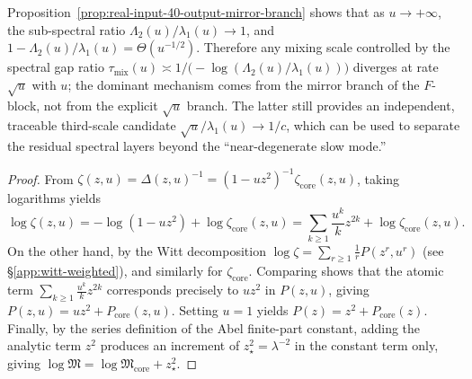 \begin{remark}\label{rem:real-input-40-output-mirror-mixing}
Proposition~\ref{prop:real-input-40-output-mirror-branch} shows that as \(u\to+\infty\), the sub-spectral ratio \(\Lambda_2(u)/\lambda_1(u)\to 1\), and
\(
1-\Lambda_2(u)/\lambda_1(u)=\Theta(u^{-1/2})
\).
Therefore any mixing scale controlled by the spectral gap ratio
\(
\tau_{\mathrm{mix}}(u)\asymp 1/\bigl(-\log(\Lambda_2(u)/\lambda_1(u))\bigr)
\)
diverges at rate \(\sqrt u\) with \(u\); the dominant mechanism comes from the mirror branch of the \(F\)-block, not from the explicit \(\sqrt u\) branch.
The latter still provides an independent, traceable third-scale candidate \(\sqrt u/\lambda_1(u)\to 1/c\), which can be used to separate the residual spectral layers beyond the ``near-degenerate slow mode.''
\end{remark}

\begin{proof}
From
\(
\zeta(z,u)=\Delta(z,u)^{-1}=(1-uz^2)^{-1}\zeta_{\mathrm{core}}(z,u)
\),
taking logarithms yields
\[
\log\zeta(z,u)=-\log(1-uz^2)+\log\zeta_{\mathrm{core}}(z,u)
=\sum_{k\ge 1}\frac{u^k}{k}z^{2k}+\log\zeta_{\mathrm{core}}(z,u).
\]
On the other hand, by the Witt decomposition \(\log\zeta=\sum_{r\ge 1}\frac{1}{r}P(z^{r},u^{r})\) (see \S\ref{app:witt-weighted}), and similarly for \(\zeta_{\mathrm{core}}\). Comparing shows that the atomic term \(\sum_{k\ge 1}\frac{u^k}{k}z^{2k}\) corresponds precisely to \(u z^2\) in \(P(z,u)\), giving
\(
P(z,u)=u z^2+P_{\mathrm{core}}(z,u)
\).
Setting \(u=1\) yields \(P(z)=z^2+P_{\mathrm{core}}(z)\).
Finally, by the series definition of the Abel finite-part constant, adding the analytic term \(z^2\) produces an increment of \(z_\star^2=\lambda^{-2}\) in the constant term only, giving
\(
\log\mathfrak{M}=\log\mathfrak{M}_{\mathrm{core}}+z_\star^2
\).
\end{proof}

